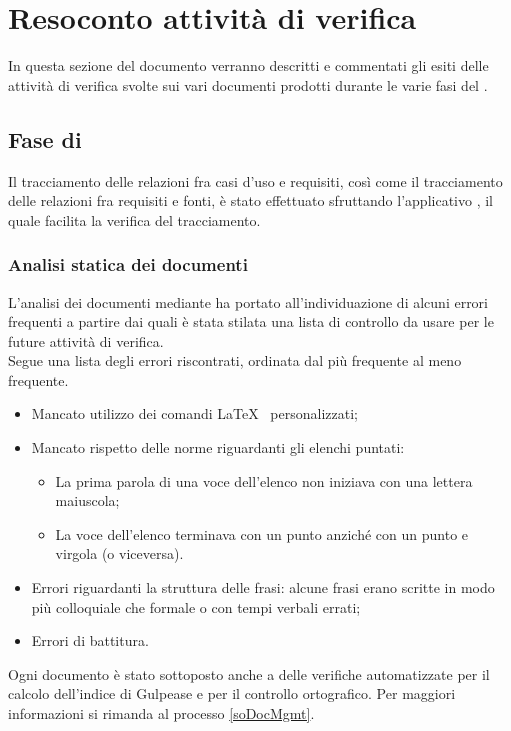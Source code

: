 \section{Resoconto attività di verifica}
\label{resocontoVerifica}
In questa sezione del documento verranno descritti e commentati gli esiti delle attività di verifica svolte sui vari documenti prodotti durante le varie fasi del .
\subsection{Fase di \fAt}
Il tracciamento delle relazioni fra casi d'uso e requisiti, così come il tracciamento delle relazioni fra requisiti e fonti, è stato effettuato sfruttando l'applicativo \pragmadb, il quale facilita la verifica del tracciamento.
\subsubsection{Analisi statica dei documenti}
L'analisi dei documenti mediante  ha portato all'individuazione di alcuni errori frequenti a partire dai quali è stata stilata una lista di controllo da usare per le future attività di verifica. \\
Segue una lista degli errori riscontrati, ordinata dal più frequente al meno frequente.
\begin{itemize}
\item Mancato utilizzo dei comandi \LaTeX~ personalizzati;
\item Mancato rispetto delle norme riguardanti gli elenchi puntati:
\begin{itemize}
\item La prima parola di una voce dell'elenco non iniziava con una lettera maiuscola;
\item La voce dell'elenco terminava con un punto anziché con un punto e virgola (o viceversa).
\end{itemize}
\item Errori riguardanti la struttura delle frasi: alcune frasi erano scritte in modo più colloquiale che formale o con tempi verbali errati;
\item Errori di battitura.
\end{itemize}
Ogni documento è stato sottoposto anche a delle verifiche automatizzate per il calcolo dell'indice di Gulpease e per il controllo ortografico. Per maggiori informazioni si rimanda al processo \ref{soDocMgmt}.
